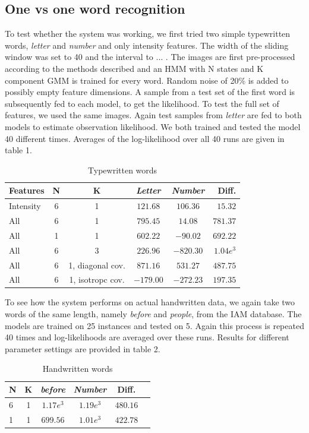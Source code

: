 \documentclass[conference]{IEEEtran}
\begin{document}
\subsection{One vs one word recognition} \label{SubS:1vs1}
To test whether the system was working, we first tried two simple typewritten words, {\it letter} and {\it number } and only intensity features. The width of the sliding window was set to 40 and the interval to ... . The images are first pre-processed according to the methods described and an HMM with N states and K component GMM is trained for every word. Random noise of 20\% is added to possibly empty feature dimensions. A sample from a test set of the first word is subsequently fed to each model, to get the likelihood. To test the full set of features, we used the same images. Again test samples from {\it letter} are fed to both models to estimate observation likelihood. We both trained and tested the model 40 different times. Averages of the log-likelihood over all 40 runs are given in table 1.
\begin{table}[H]
 \caption{Typewritten words}
  \begin{tabular}{|l|c|c|c|c|r|}\hline
    Features 	& N 	& K 			& {\it Letter}	& {\it Number} 	& Diff. 	\\\hline
    Intensity 	& 6	& 1 			& $121.68$ 	& $106.36$ 	& $15.32$	\\
    All		& 6  	& 1 			& $795.45$ 	& $14.08$  	& $781.37$	\\
    All 	& 1	& 1 			& $602.22$ 	& $-90.02$ 	& $692.22$	\\
    All 	& 6 	& 3 			& $226.96$ 	& $-820.30$ 	& $1.04e^{3}$	\\
    All 	& 6 	& 1,  diagonal cov. 	& $871.16$ 	& $531.27$ 	& $487.75$	\\
    All 	& 6 	& 1,  isotropc cov. 	& $-179.00$ 	& $-272.23$ 	& $197.35$	\\\hline
\end{tabular}
\end{table}
To see how the system performs on actual handwritten data, we again take two words of the same length, namely {\it before} and {\it people}, from the IAM database. The models are trained on 25 instances and tested on 5. Again this process is repeated 40 times and log-likelihoods are averaged over these runs. Results for different parameter settings are provided in table 2.
\begin{table}[H]
\centering
\caption{Handwritten words}
 \begin{tabular}{|l|c|c|c|c|r|}\hline
  N 	& K 	& {\it before} 		& {\it Number} 	& 	Diff. 		\\\hline
  6 	& 1 	&  $1.17e^3$ 		& $1.19e^3$ 	& 	$480.16$	\\
  1 	& 1 	&  $699.56$ 		& $1.01e^3$ 	&	$422.78$	\\\hline
 \end{tabular}
\end{table}
\end{document}
